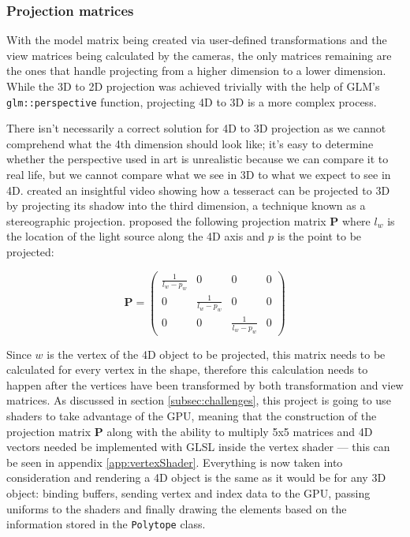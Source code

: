 \documentclass[11pt, a4paper]{article}
\begin{document}
\subsubsection{Projection matrices}

With the model matrix being created via user-defined transformations and the view matrices being calculated by the cameras, the only matrices remaining are the ones that handle projecting from a higher dimension to a lower dimension. While the 3D to 2D projection was achieved trivially with the help of GLM's \texttt{glm::perspective} function, projecting 4D to 3D is a more complex process. 

There isn't necessarily a correct solution for 4D to 3D projection as we cannot comprehend what the 4th dimension should look like; it's easy to determine whether the perspective used in art is unrealistic because we can compare it to real life, but we cannot compare what we see in 3D to what we expect to see in 4D. \citeauthor{schloss2016understanding} \parencite*[2:42]{schloss2016understanding} created an insightful video showing how a tesseract can be projected to 3D by projecting its shadow into the third dimension, a technique known as a stereographic projection. \citeauthor{schloss2016understanding} proposed the following projection matrix $\textbf{P}$ where $l_w$ is the location of the light source along the 4D axis and $p$ is the point to be projected:

\begin{equation*}
  \textbf{P} =
  \begin{pmatrix}
    \frac{1}{l_w - p_w} & 0 & 0 & 0 \\
    0 & \frac{1}{l_w - p_w} & 0 & 0 \\
    0 & 0 & \frac{1}{l_w - p_w} & 0
  \end{pmatrix}
\end{equation*}

Since $w$ is the vertex of the 4D object to be projected, this matrix needs to be calculated for every vertex in the shape, therefore this calculation needs to happen after the vertices have been transformed by both transformation and view matrices. As discussed in section \ref{subsec:challenges}, this project is going to use shaders to take advantage of the GPU, meaning that the construction of the projection matrix $\textbf{P}$ along with the ability to multiply 5x5 matrices and 4D vectors needed be implemented with GLSL inside the vertex shader --- this can be seen in appendix \ref{app:vertexShader}. Everything is now taken into consideration and rendering a 4D object is the same as it would be for any 3D object: binding buffers, sending vertex and index data to the GPU, passing uniforms to the shaders and finally drawing the elements based on the information stored in the \texttt{Polytope} class.
\end{document}
